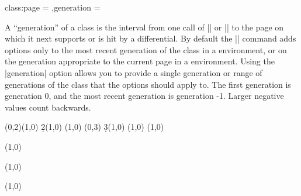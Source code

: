 \begin{sseqdata}[|| name = ex1, cohomological Serre grading]
\begin{keylist}{class:page = ,generation = }
\begin{codeexample}[width = 6cm]
\printpage[ name = page_example, page = 1 ] \qquad
\printpage[ name = page_example, page = 2 ] \qquad
\printpage[ name = page_example, page = 4 ]
\end{codeexample}
A ``generation'' of a class is the interval from one call of |\class| or |\replaceclass| to the page on which it next supports or is hit by a differential.
By default the |\classoptions| command adds options only to the most recent generation of the class in a \sseqdataenv\space environment, or on the generation appropriate to the current page in a \sseqpageenv\space environment. Using the |generation| option allows you to provide a single generation or range of generations of the class that the options should apply to. The first generation is generation 0, and the most recent generation is generation -1. Larger negative values count backwards.
\begin{codeexample}[]
\begin{sseqdata}[ name = page_example2, Adams grading, xscale = 0.6, yscale = 0.5 ]
\class(0,2)\class(1,0)
\d2(1,0)
\replaceclass(1,0)
\class(0,3)
\d3(1,0)
\replaceclass(1,0)
(1,0) %
\end{sseqdata}

\printpage[ name = page_example2, page = 1 ] %
\quad
\begin{sseqpage}[ name = page_example2, page = 1, keep changes ]
(1,0) %
\end{sseqpage} \quad

\printpage[ name = page_example2, page = 2 ] \quad

\printpage[ name = page_example2, page = 3 ] \quad

\printpage[ name = page_example2, page = 4 ]
\end{codeexample}

\begin{codeexample}[]
\begin{sseqdata}[ name = page_example2, Adams grading,update existing ]
\classoptions[fill, red, generation = 0 ---- -1](1,0)
\end{sseqdata}

\printpage[ name = page_example2, page = 1 ]%
\quad
\begin{sseqpage}[ name = page_example2, page = 1, keep changes ]
(1,0) %
\end{sseqpage} \quad


\end{codeexample}
\end{keylist}
\end{sseqdata}
